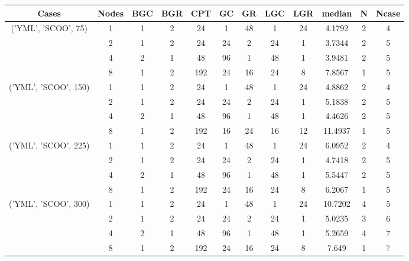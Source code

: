 \begin{tabular}{cccccccccccc}
\hline
Cases & Nodes& BGC& BGR& CPT& GC& GR& LGC& LGR& median & N & Ncase \\
\hline
\multirow{4}{*}{('YML', 'SCOO', 75)}& 1& 1& 2& 24& 1& 48& 1& 24& 4.1792& 2& 4\\
& 2& 1& 2& 24& 24& 2& 24& 1& 3.7344& 2& 5\\
& 4& 2& 1& 48& 96& 1& 48& 1& 3.9481& 2& 5\\
& 8& 1& 2& 192& 24& 16& 24& 8& 7.8567& 1& 5\\
\hline
\multirow{4}{*}{('YML', 'SCOO', 150)}& 1& 1& 2& 24& 1& 48& 1& 24& 4.8862& 2& 4\\
& 2& 1& 2& 24& 24& 2& 24& 1& 5.1838& 2& 5\\
& 4& 2& 1& 48& 96& 1& 48& 1& 4.4626& 2& 5\\
& 8& 1& 2& 192& 16& 24& 16& 12& 11.4937& 1& 5\\
\hline
\multirow{4}{*}{('YML', 'SCOO', 225)}& 1& 1& 2& 24& 1& 48& 1& 24& 6.0952& 2& 4\\
& 2& 1& 2& 24& 24& 2& 24& 1& 4.7418& 2& 5\\
& 4& 2& 1& 48& 96& 1& 48& 1& 5.5447& 2& 5\\
& 8& 1& 2& 192& 24& 16& 24& 8& 6.2067& 1& 5\\
\hline
\multirow{4}{*}{('YML', 'SCOO', 300)}& 1& 1& 2& 24& 1& 48& 1& 24& 10.7202& 4& 5\\
& 2& 1& 2& 24& 24& 2& 24& 1& 5.0235& 3& 6\\
& 4& 2& 1& 48& 96& 1& 48& 1& 5.2659& 4& 7\\
& 8& 1& 2& 192& 24& 16& 24& 8& 7.649& 1& 7\\
\hline
\end{tabular}



